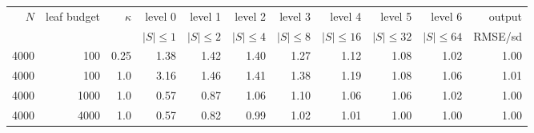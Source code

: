 \begin{tabular}{@{}rrrrrrrrrrr@{}}\toprule
$N$ & leaf budget & $\kappa$ & level 0 & level 1 & level 2 & level 3 & level 4 & level 5 & level 6 & output\\
 & & & $|S|{\le}1$ & $|S|{\le}2$ & $|S|{\le}4$ & $|S|{\le}8$ & $|S|{\le}16$ & $|S|{\le}32$ & $|S|{\le}64$ & RMSE/sd\\\midrule
4000 & 100 & 0.25 & 1.38 & 1.42 & 1.40 & 1.27 & 1.12 & 1.08 & 1.02 & 1.00\\
4000 & 100 & 1.0 & 3.16 & 1.46 & 1.41 & 1.38 & 1.19 & 1.08 & 1.06 & 1.01\\
4000 & 1000 & 1.0 & 0.57 & 0.87 & 1.06 & 1.10 & 1.06 & 1.06 & 1.02 & 1.00\\
4000 & 4000 & 1.0 & 0.57 & 0.82 & 0.99 & 1.02 & 1.01 & 1.00 & 1.00 & 1.00\\
\bottomrule\end{tabular}